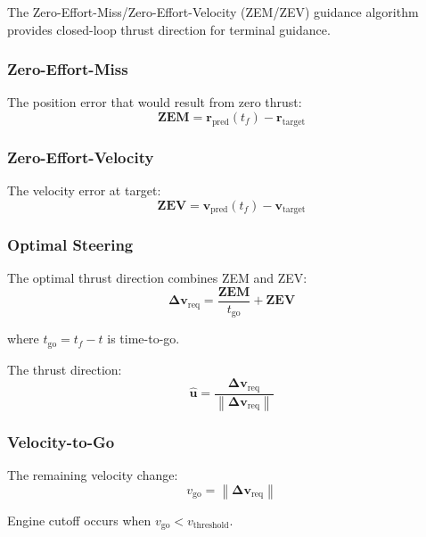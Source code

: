 \documentclass[11pt,a4paper]{article}
\newcommand{\vect}[1]{\bm{#1}}
\newcommand{\norm}[1]{\left\lVert #1 \right\rVert}
\begin{document}
The Zero-Effort-Miss/Zero-Effort-Velocity (ZEM/ZEV) guidance algorithm provides closed-loop thrust direction for terminal guidance.

\subsubsection{Zero-Effort-Miss}

The position error that would result from zero thrust:
\begin{equation}
    \vect{\text{ZEM}} = \vect{r}_\text{pred}(t_f) - \vect{r}_\text{target}
\end{equation}

\subsubsection{Zero-Effort-Velocity}

The velocity error at target:
\begin{equation}
    \vect{\text{ZEV}} = \vect{v}_\text{pred}(t_f) - \vect{v}_\text{target}
\end{equation}

\subsubsection{Optimal Steering}

The optimal thrust direction combines ZEM and ZEV:
\begin{equation}
    \vect{\Delta v}_\text{req} = \frac{\vect{\text{ZEM}}}{t_\text{go}} + \vect{\text{ZEV}}
\end{equation}

where $t_\text{go} = t_f - t$ is time-to-go.

The thrust direction:
\begin{equation}
    \hat{\vect{u}} = \frac{\vect{\Delta v}_\text{req}}{\norm{\vect{\Delta v}_\text{req}}}
\end{equation}

\subsubsection{Velocity-to-Go}

The remaining velocity change:
\begin{equation}
    v_\text{go} = \norm{\vect{\Delta v}_\text{req}}
\end{equation}

Engine cutoff occurs when $v_\text{go} < v_\text{threshold}$.
\end{document}
